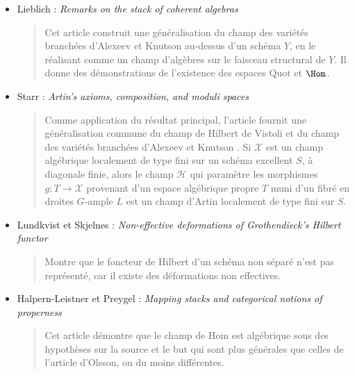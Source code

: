 \begin{itemize}
(\cite{alexeev-knutson})
\begin{quote}
Ils définissent une variété branchée de $\mathbf{P}^n$ comme un morphisme fini
$X \rightarrow \mathbf{P}^n$ provenant d'un schéma \emph{réduit} $X$. Ils
démontrent que le champ de modules des variétés branchées de polynôme de
Hilbert fixé et de degrés totaux fixés pour les composantes de dimension $i$
est un champ d'Artin propre à stabilisateur fini. Ils comparent le champ des
variétés branchées au schéma de Hilbert, au schéma de Chow et à l'espace de
modules des applications stables.
\end{quote}
\item Lieblich : \emph{Remarks on the stack of coherent algebras}
\cite{lieblich_remarks}
\begin{quote}
Cet article construit une généralisation du champ des variétés branchées
d'Alexeev et Knutson au-dessus d'un schéma $Y$, en le réalisant comme un champ
d'algèbres sur le faisceau structural de $Y$. Il donne des démonstrations de
l'existence des espaces $\text{Quot}$ et $\Hom$.
\end{quote}
\item Starr : \emph{Artin's axioms, composition, and moduli spaces}
\cite{starr_artin}
\begin{quote}
Comme application du résultat principal, l'article fournit une généralisation
commune du champ de Hilbert de Vistoli \cite{vistoli_hilbert} et du champ des
variétés branchées d'Alexeev et Knutson \cite{alexeev-knutson}. Si
$\mathcal{X}$ est un champ algébrique localement de type fini sur un schéma
excellent $S$, à diagonale finie, alors le champ $\mathcal{H}$ qui paramètre
les morphismes $g: T \rightarrow \mathcal{X}$ provenant d'un espace algébrique
propre $T$ muni d'un fibré en droites $G$-ample $L$ est un champ d'Artin
localement de type fini sur $S$.
\end{quote}
\item Lundkvist et Skjelnes :
\emph{Non-effective deformations of Grothendieck's Hilbert functor}
\cite{lundkvist-skjelnes}
\begin{quote}
Montre que le foncteur de Hilbert d'un schéma non séparé n'est pas représenté,
car il existe des déformations non effectives.
\end{quote}
\item Halpern-Leistner et Preygel :
\emph{Mapping stacks and categorical notions of properness}
\cite{HL-P}
\begin{quote}
Cet article démontre que le champ de Hom est algébrique sous des hypothèses sur
la source et le but qui sont plus générales que celles de l'article d'Olsson,
ou du moins différentes.
\end{quote}
\end{itemize}



